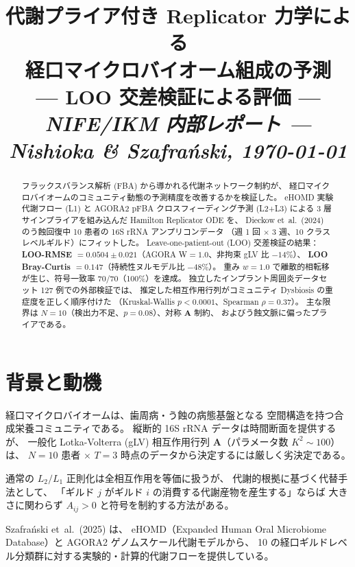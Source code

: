\documentclass[10pt,a4paper]{article}
\title{%
  \textbf{代謝プライア付き Replicator 力学による\\
  経口マイクロバイオーム組成の予測\\
  --- LOO 交差検証による評価 ---}\\[6pt]
  \large \textit{NIFE/IKM 内部レポート --- Nishioka \& Szafra\'{n}ski, \today}
}
\author{}
\date{}
\newcommand{\bA}{\mathbf{A}}
\begin{document}
\maketitle\thispagestyle{fancy}
\vspace{-1em}

\begin{abstract}
\noindent
フラックスバランス解析 (FBA) から導かれる代謝ネットワーク制約が、
経口マイクロバイオームのコミュニティ動態の予測精度を改善するかを検証した。
eHOMD 実験代謝フロー (L1) と AGORA2 pFBA クロスフィーディング予測 (L2+L3)
による 3 層サインプライアを組み込んだ Hamilton Replicator ODE を、
Dieckow et~al.~(2024) のう蝕回復中 10 患者の 16S rRNA アンプリコンデータ
（週 1 回 $\times$ 3 週、10 クラスレベルギルド）にフィットした。
Leave-one-patient-out (LOO) 交差検証の結果：
\textbf{LOO-RMSE $= 0.0504 \pm 0.021$}（AGORA W$=1.0$、非拘束 gLV 比 $-14\%$）、
\textbf{LOO Bray-Curtis $= 0.147$}（持続性ヌルモデル比 $-48\%$）。
重み $w=1.0$ で離散的相転移が生じ、符号一致率 70/70（100\%）を達成。
独立したインプラント周囲炎データセット 127 例での外部検証では、
推定した相互作用行列がコミュニティ Dysbiosis の重症度を正しく順序付けた
（Kruskal-Wallis $p < 0.0001$、Spearman $\rho = 0.37$）。
主な限界は $N=10$（検出力不足、$p=0.08$）、対称 $\bA$ 制約、
およびう蝕文脈に偏ったプライアである。
\end{abstract}

\tableofcontents\bigskip

\section{背景と動機}

経口マイクロバイオームは、歯周病・う蝕の病態基盤となる
空間構造を持つ合成栄養コミュニティである。
縦断的 16S rRNA データは時間断面を提供するが、
一般化 Lotka-Volterra (gLV) 相互作用行列 $\bA$（パラメータ数 $K^2 \sim 100$）は、
$N=10$ 患者 $\times$ $T=3$ 時点のデータから決定するには厳しく劣決定である。

通常の $L_2/L_1$ 正則化は全相互作用を等価に扱うが、
代謝的根拠に基づく代替手法として、
「ギルド $j$ がギルド $i$ の消費する代謝産物を産生する」ならば
大きさに関わらず $A_{ij}>0$ と符号を制約する方法がある。

Szafra\'{n}ski et~al.~(2025) は、
eHOMD（Expanded Human Oral Microbiome Database）と AGORA2 ゲノムスケール代謝モデルから、
10 の経口ギルドレベル分類群に対する実験的・計算的代謝フローを提供している。
\end{document}
